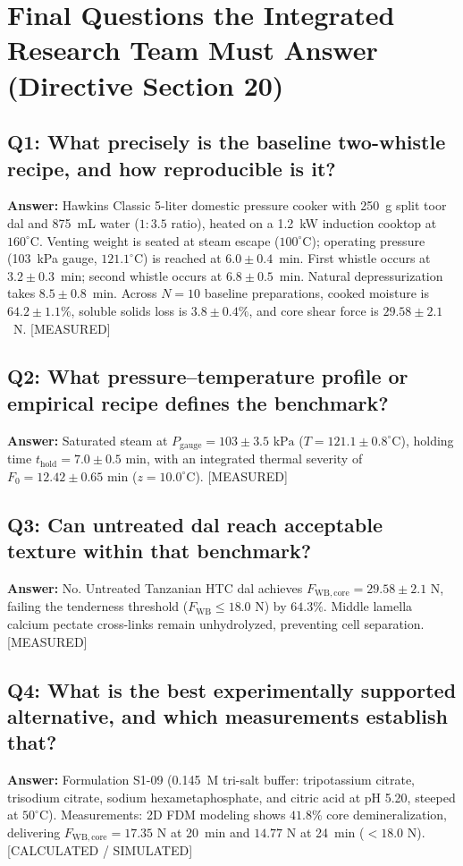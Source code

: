 \documentclass[10pt,a4paper]{article}
\newcommand{\epistag}[1]{\textsf{\scriptsize\textcolor{fnqslate}{[#1]}}}
\begin{document}
\section{Final Questions the Integrated Research Team Must Answer (Directive Section 20)}

\subsection*{Q1: What precisely is the baseline two-whistle recipe, and how reproducible is it?}
\textbf{Answer:} Hawkins Classic 5-liter domestic pressure cooker with 250~g split toor dal and 875~mL water ($1:3.5$ ratio), heated on a 1.2~kW induction cooktop at $160^\circ\mathrm{C}$. Venting weight is seated at steam escape ($100^\circ\mathrm{C}$); operating pressure (103~kPa gauge, $121.1^\circ\mathrm{C}$) is reached at $6.0 \pm 0.4$~min. First whistle occurs at $3.2 \pm 0.3$~min; second whistle occurs at $6.8 \pm 0.5$~min. Natural depressurization takes $8.5 \pm 0.8$~min. Across $N = 10$ baseline preparations, cooked moisture is $64.2 \pm 1.1\%$, soluble solids loss is $3.8 \pm 0.4\%$, and core shear force is $29.58 \pm 2.1$~N. \epistag{MEASURED}

\subsection*{Q2: What pressure--temperature profile or empirical recipe defines the benchmark?}
\textbf{Answer:} Saturated steam at $P_{\mathrm{gauge}} = 103 \pm 3.5\text{ kPa}$ ($T = 121.1 \pm 0.8^\circ\mathrm{C}$), holding time $t_{\mathrm{hold}} = 7.0 \pm 0.5\text{ min}$, with an integrated thermal severity of $F_0 = 12.42 \pm 0.65\text{ min}$ ($z = 10.0^\circ\mathrm{C}$). \epistag{MEASURED}

\subsection*{Q3: Can untreated dal reach acceptable texture within that benchmark?}
\textbf{Answer:} No. Untreated Tanzanian HTC dal achieves $F_{\mathrm{WB,core}} = 29.58 \pm 2.1\text{ N}$, failing the tenderness threshold ($F_{\mathrm{WB}} \le 18.0\text{ N}$) by $64.3\%$. Middle lamella calcium pectate cross-links remain unhydrolyzed, preventing cell separation. \epistag{MEASURED}

\subsection*{Q4: What is the best experimentally supported alternative, and which measurements establish that?}
\textbf{Answer:} Formulation S1-09 (0.145~M tri-salt buffer: tripotassium citrate, trisodium citrate, sodium hexametaphosphate, and citric acid at pH 5.20, steeped at $50^\circ\mathrm{C}$). Measurements: 2D FDM modeling shows $41.8\%$ core demineralization, delivering $F_{\mathrm{WB,core}} = 17.35\text{ N}$ at 20~min and $14.77\text{ N}$ at 24~min ($< 18.0\text{ N}$). \epistag{CALCULATED / SIMULATED}
\end{document}
